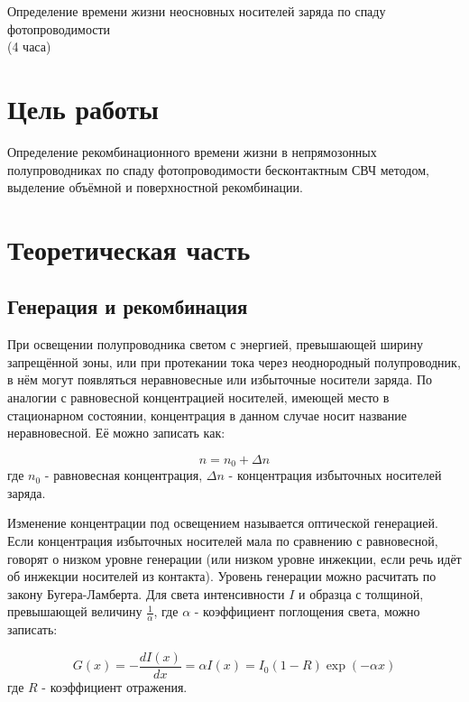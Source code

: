 \newpage

\setcounter{chapter}{4}
\setcounter{section}{0}
\setcounter{figure}{0}
\setcounter{table}{0}
\setcounter{equation}{0}

\begin{center}
Определение времени жизни неосновных носителей заряда по спаду фотопроводимости\\
(4 часа)
\end{center}

\section{Цель работы}
Определение рекомбинационного времени жизни в непрямозонных полупроводниках по спаду фотопроводимости бесконтактным СВЧ методом, выделение объёмной и поверхностной рекомбинации.

\section{Теоретическая часть}

\subsection{Генерация и рекомбинация}
При освещении полупроводника светом с энергией, превышающей ширину запрещённой зоны, или при протекании тока через неоднородный полупроводник, в нём могут появляться неравновесные или избыточные носители заряда. По аналогии с равновесной концентрацией носителей, имеющей место в стационарном состоянии, концентрация в данном случае носит название неравновесной. Её можно записать как:

\begin{equation}
n = n_{0} + \Delta n
\end{equation}
где $n_{0}$ - равновесная концентрация, $\Delta n$ - концентрация избыточных носителей заряда.

Изменение концентрации под освещением называется оптической генерацией. Если концентрация избыточных носителей мала по сравнению с равновесной, говорят о низком уровне генерации (или низком уровне инжекции, если речь идёт об инжекции носителей из контакта). Уровень генерации можно расчитать по закону Бугера-Ламберта. Для света интенсивности $I$ и образца с толщиной, превышающей величину $\frac{1}{\alpha}$, где $\alpha$ - коэффициент поглощения света, можно записать:

\begin{equation}
G(x) = -\frac{d I(x)}{d x} = \alpha I(x) = I_{0} (1-R) \exp(-\alpha x)
\end{equation}
где $R$ - коэффициент отражения.

